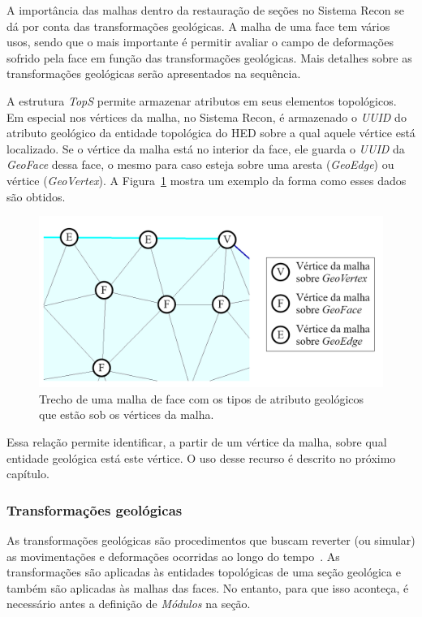 A importância das malhas dentro da restauração de seções no Sistema Recon se dá por conta das transformações geológicas. A malha de uma face tem vários usos, sendo que o mais importante é permitir avaliar o campo de deformações sofrido pela face em função das transformações geológicas. Mais detalhes sobre as transformações geológicas serão apresentados na sequência.

A estrutura \textit{TopS} permite armazenar atributos em seus elementos topológicos. Em especial nos vértices da malha, no Sistema Recon, é armazenado o \textit{UUID} do atributo geológico da entidade topológica do HED sobre a qual aquele vértice está localizado. Se o vértice da malha está no interior da face, ele guarda o \textit{UUID} da \textit{GeoFace} dessa face, o mesmo para caso esteja sobre uma aresta (\textit{GeoEdge}) ou vértice (\textit{GeoVertex}). A Figura~\ref{fig-recon-4} mostra um exemplo da forma como esses dados são obtidos.

\begin{figure} [H]
  \begin{center}
    \includegraphics[width=\textwidth]{images/fig-recon-4}
    \caption{Trecho de uma malha de face com os tipos de atributo geológicos que estão sob os vértices da malha.}\label{fig-recon-4}
  \end{center}
\end{figure}

Essa relação permite identificar, a partir de um vértice da malha, sobre qual entidade geológica está este vértice. O uso desse recurso é descrito no próximo capítulo.

\subsubsection{Transformações geológicas}

As transformações geológicas são procedimentos que buscam reverter (ou simular) as movimentações e deformações ocorridas ao longo do tempo~\cite{Santi}. As transformações são aplicadas às entidades topológicas de uma seção geológica e também são aplicadas às malhas das faces. No entanto, para que isso aconteça, é necessário antes a definição de \textit{Módulos} na seção. 

